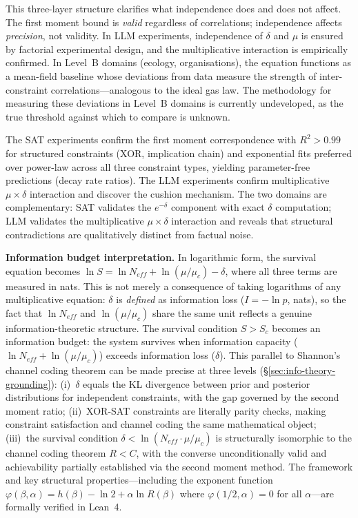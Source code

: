 \documentclass[11pt,a4paper]{article}
\begin{document}
\noindent This three-layer structure clarifies what independence does and does not affect. The first moment bound is \emph{valid} regardless of correlations; independence affects \emph{precision}, not validity. In LLM experiments, independence of $\delta$ and $\mu$ is ensured by factorial experimental design, and the multiplicative interaction is empirically confirmed. In Level~B domains (ecology, organisations), the equation functions as a mean-field baseline whose deviations from data measure the strength of inter-constraint correlations---analogous to the ideal gas law. The methodology for measuring these deviations in Level~B domains is currently undeveloped, as the true threshold against which to compare is unknown.

The SAT experiments confirm the first moment correspondence with $R^2 > 0.99$ for structured constraints (XOR, implication chain) and exponential fits preferred over power-law across all three constraint types, yielding parameter-free predictions (decay rate ratios). The LLM experiments confirm multiplicative $\mu \times \delta$ interaction and discover the cushion mechanism. The two domains are complementary: SAT validates the $e^{-\delta}$ component with exact $\delta$ computation; LLM validates the multiplicative $\mu \times \delta$ interaction and reveals that structural contradictions are qualitatively distinct from factual noise.

\textbf{Information budget interpretation.} In logarithmic form, the survival equation becomes $\ln S = \ln N_{eff} + \ln(\mu/\mu_c) - \delta$, where all three terms are measured in nats. This is not merely a consequence of taking logarithms of any multiplicative equation: $\delta$ is \emph{defined} as information loss ($I = -\ln p$, nats), so the fact that $\ln N_{eff}$ and $\ln(\mu/\mu_c)$ share the same unit reflects a genuine information-theoretic structure. The survival condition $S > S_c$ becomes an information budget: the system survives when information capacity ($\ln N_{eff} + \ln(\mu/\mu_c)$) exceeds information loss ($\delta$). This parallel to Shannon's channel coding theorem \citep{shannon1948} can be made precise at three levels (\S\ref{sec:info-theory-grounding}): (i)~$\delta$ equals the KL divergence between prior and posterior distributions for independent constraints, with the gap governed by the second moment ratio; (ii)~XOR-SAT constraints are literally parity checks, making constraint satisfaction and channel coding the same mathematical object; (iii)~the survival condition $\delta < \ln(N_{eff} \cdot \mu/\mu_c)$ is structurally isomorphic to the channel coding theorem $R < C$, with the converse unconditionally valid and achievability partially established via the second moment method. The framework and key structural properties---including the exponent function $\varphi(\beta, \alpha) = h(\beta) - \ln 2 + \alpha \ln R(\beta)$ where $\varphi(1/2, \alpha) = 0$ for all $\alpha$---are formally verified in Lean~4.
\end{document}

